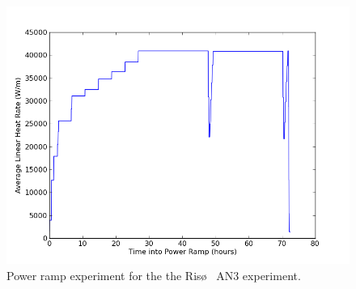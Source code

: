 \begin{figure}
\caption{\label{fig:riso_power_ramp}
Power ramp experiment for the the Ris\o~ AN3 experiment.}
 \begin{center}
  \includegraphics[scale=.75]{./Chapter4/power_ramp.png}
 \end{center}
\end{figure} 

